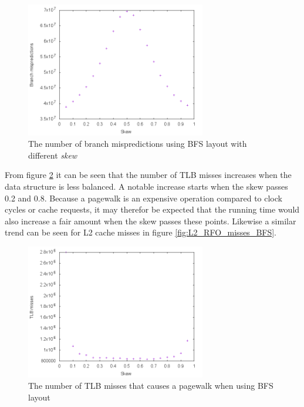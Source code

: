 \documentclass{article}
\begin{document}
\begin{figure}[H]
	\centering
	\includegraphics[width=0.7\textwidth]{figures/BFS_branch_misses}
	\caption{The number of branch mispredictions using BFS layout with different \textit{skew}}
	\label{fig:branch_misses}
\end{figure}

From figure \ref{fig:TLB_misses_BFS} it can be seen that the number of TLB misses increases when the data structure is less balanced. A notable increase starts when the skew passes 0.2 and 0.8. Because a pagewalk is an expensive operation compared to clock cycles or cache requests, it may therefor be expected that the running time would also increase a fair amount when the skew passes these points. Likewise a similar trend can be seen for L2 cache misses in figure \ref{fig:L2_RFO_misses_BFS}.

\begin{figure}[H]
	\centering
	\includegraphics[width=0.7\textwidth]{figures/BFS_TLB_misses}
	\caption{The number of TLB misses that causes a pagewalk when using BFS layout}
	\label{fig:TLB_misses_BFS}
\end{figure}
\end{document}
